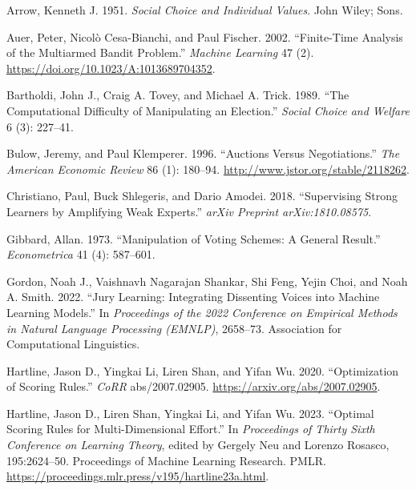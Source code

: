 \documentclass[
  letterpaper,
  numbers=noenddot,
  DIV=11]{scrreprt}
\newlength{\cslhangindent}
\newenvironment{CSLReferences}[2] %
 {\begin{list}{}{%
  \setlength{\itemindent}{0pt}
  \setlength{\leftmargin}{0pt}
  \setlength{\parsep}{0pt}
  \ifodd #1
   \setlength{\leftmargin}{\cslhangindent}
   \setlength{\itemindent}{-1\cslhangindent}
  \fi
  \setlength{\itemsep}{#2\baselineskip}}}
 {\end{list}}
\theoremstyle{plain}
\theoremstyle{definition}
\theoremstyle{remark}
\begin{document}
\label{refs-5}
\begin{CSLReferences}{1}{0}
Arrow, Kenneth J. 1951. \emph{Social Choice and Individual Values}. John
Wiley; Sons.

Auer, Peter, Nicolò Cesa-Bianchi, and Paul Fischer. 2002. {``Finite-Time
Analysis of the Multiarmed Bandit Problem.''} \emph{Machine Learning} 47
(2). \url{https://doi.org/10.1023/A:1013689704352}.

Bartholdi, John J., Craig A. Tovey, and Michael A. Trick. 1989. {``The
Computational Difficulty of Manipulating an Election.''} \emph{Social
Choice and Welfare} 6 (3): 227--41.

Bulow, Jeremy, and Paul Klemperer. 1996. {``Auctions Versus
Negotiations.''} \emph{The American Economic Review} 86 (1): 180--94.
\url{http://www.jstor.org/stable/2118262}.

Christiano, Paul, Buck Shlegeris, and Dario Amodei. 2018. {``Supervising
Strong Learners by Amplifying Weak Experts.''} \emph{arXiv Preprint
arXiv:1810.08575}.

Gibbard, Allan. 1973. {``Manipulation of Voting Schemes: A General
Result.''} \emph{Econometrica} 41 (4): 587--601.

Gordon, Noah J., Vaishnavh Nagarajan Shankar, Shi Feng, Yejin Choi, and
Noah A. Smith. 2022. {``Jury Learning: Integrating Dissenting Voices
into Machine Learning Models.''} In \emph{Proceedings of the 2022
Conference on Empirical Methods in Natural Language Processing (EMNLP)},
2658--73. Association for Computational Linguistics.

Hartline, Jason D., Yingkai Li, Liren Shan, and Yifan Wu. 2020.
{``Optimization of Scoring Rules.''} \emph{CoRR} abs/2007.02905.
\url{https://arxiv.org/abs/2007.02905}.

Hartline, Jason D., Liren Shan, Yingkai Li, and Yifan Wu. 2023.
{``Optimal Scoring Rules for Multi-Dimensional Effort.''} In
\emph{Proceedings of Thirty Sixth Conference on Learning Theory}, edited
by Gergely Neu and Lorenzo Rosasco, 195:2624--50. Proceedings of Machine
Learning Research. PMLR.
\url{https://proceedings.mlr.press/v195/hartline23a.html}.


\end{CSLReferences}
\end{document}
